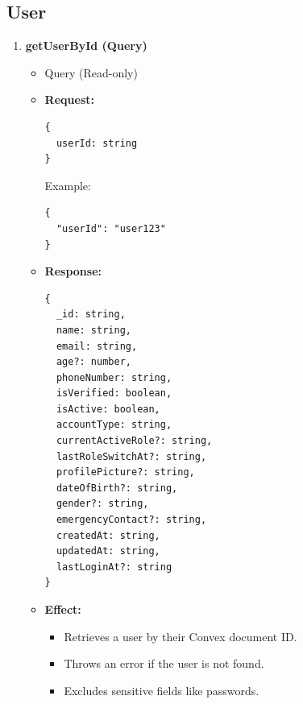 \documentclass[a4paper,12pt]{article}
\begin{document}
\subsection*{User}

\begin{enumerate}

  \item \textbf{getUserById (Query)}
    \begin{itemize}
      \item Query (Read-only)
      \item \textbf{Request:}
      \begin{verbatim}
{
  userId: string
}
      \end{verbatim}
      Example:
      \begin{verbatim}
{
  "userId": "user123"
}
      \end{verbatim}
      \item \textbf{Response:}
      \begin{verbatim}
{
  _id: string,
  name: string,
  email: string,
  age?: number,
  phoneNumber: string,
  isVerified: boolean,
  isActive: boolean,
  accountType: string,
  currentActiveRole?: string,
  lastRoleSwitchAt?: string,
  profilePicture?: string,
  dateOfBirth?: string,
  gender?: string,
  emergencyContact?: string,
  createdAt: string,
  updatedAt: string,
  lastLoginAt?: string
}
      \end{verbatim}
      \item \textbf{Effect:}
      \begin{itemize}
        \item Retrieves a user by their Convex document ID.
        \item Throws an error if the user is not found.
        \item Excludes sensitive fields like passwords.
      \end{itemize}
    \end{itemize}


\end{enumerate}
\end{document}
